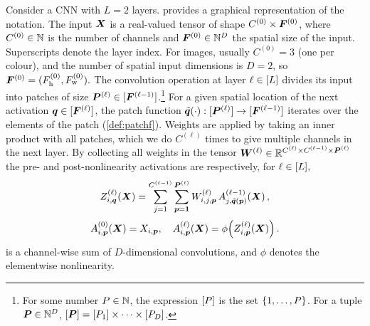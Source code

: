 \documentclass[accepted]{uai2021} %
\newcommand{\layerAs}[2]{Z^{(#1)}_{#2}(\vX)}
\newcommand{\layerC}[1]{C^{(#1)}}
\newcommand{\layerNLAs}[2]{A^{(#1)}_{#2}(\vX)}
\newcommand{\layerWs}[1]{W^{(#1)}}
\newcommand{\layerW}[1]{\mW^{(#1)}}
\newcommand{\layersizebase}{\vF}
\newcommand{\layersize}[1]{{\layersizebase^{\bra{#1}}}}
\newcommand{\layerw}[1]{F_\text{w}^{(#1)}}
\newcommand{\layerh}[1]{F_\text{h}^{(#1)}}
\newcommand{\patchsizebase}{\vP}
\newcommand{\patchsizebases}{P}
\newcommand{\patchsize}[1]{{\patchsizebase^{\bra{#1}}}}
\newcommand{\patchw}[1]{P_\text{w}^{(#1)}}
\newcommand{\patchh}[1]{P_\text{h}^{(#1)}}
\newcommand{\patchf}[2]{{\tilde#1\bra{#2}}}
\newcommand{\convpatch}[1]{{\text{im}\bra{\tilde#1}}}
\newcommand{\chan}{i}
\newcommand{\prevchan}{j}   %
\newcommand{\patch}{\vp}               %
\newcommand{\nextpatch}{\vq}
\newcommand{\0}{\boldsymbol{0}}
\newcommand{\1}{\boldsymbol{1}}
\newcommand{\crefp}[1]{(\cref{#1})}
\begin{document}
Consider a CNN with $L=2$ layers.  provides a graphical representation of the notation.
The input ${\bm{X}}$ is a real-valued tensor of shape ${\layerC{0} \times \layersize{0}}$, where $\layerC{0} \in \sN$ is the number of channels and $\layersize{0} \in \sN^{D}$ the spatial size of the input.  Superscripts denote the layer index.
For images, usually $\layerC{0}=3$ (one per colour), and the number of spatial input dimensions is $D=2$, so $\layersize{0} = (\layerh{0}, \layerw{0}).$
The convolution operation at layer $\ell\in[L]$ divides its input into patches of size
$\patchsize{\ell} \in \countto{\layersize{\ell-1}}$.\footnote{For some number
  $\patchsizebases\in \sN$, the expression $\countto{\patchsizebases}$ is the
  set $\cb{1,\dots,\patchsizebases}$. For a tuple $\patchsizebase\in\sN^{D}$,
  $\countto{\patchsizebase} = \countto{\patchsizebases_{1}}\times \dots \times \countto{\patchsizebases_{D}}$.}
For a given spatial location of the next activation
$\nextpatch\in\countto{\layersize{\ell}}$, the patch function
$\patchf{\nextpatch}{\cdot}: \countto{\patchsize{\ell}} \to \countto{\layersize{\ell-1}}$
iterates over the elements of the patch \crefp{def:patchf}. Weights are applied by taking an inner product with all patches, which we do $\layerC{\ell}$ times to give multiple channels in the next layer. By collecting all weights in the tensor $\layerW{\ell}\in\sR^{\layerC{\ell}\times \layerC{\ell-1}\times \patchsize{\ell}}$ the pre- and post-nonlinearity activations are respectively, for $\ell\in[L],$
\begin{equation}
    \layerAs{\ell}{\chan,\nextpatch} = \sum_{\prevchan=1}^{\layerC{\ell-1}} \sum_{\patch=\1}^{\patchsize{\ell}} \layerWs{\ell}_{\chan,\prevchan,\patch}\, \layerNLAs{\ell-1}{\prevchan,\patchf{\nextpatch}{\patch}}\,,
    \label{eq:deep-recursion}
\end{equation}
\begin{equation}
  \layerNLAs{0}{\chan,\patch} = X_{\chan,\patch},\quad \layerNLAs{\ell}{\chan,\patch} = \phi\bra{\layerAs{\ell}{\chan,\patch}}\,.
  \label{eq:deep-activations}
\end{equation}
 is a channel-wise sum of $D$-dimensional convolutions, and $\phi$ denotes the elementwise nonlinearity.
\end{document}
